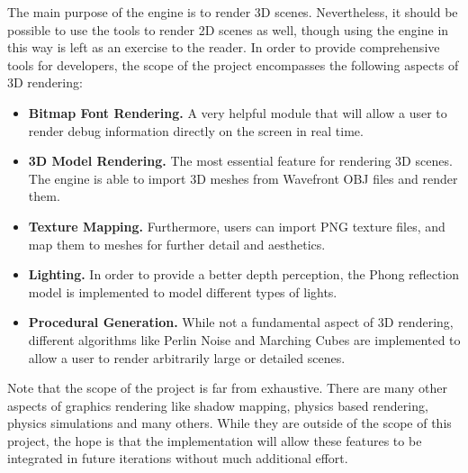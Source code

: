 The main purpose of the engine is to render 3D scenes.
Nevertheless, it should be possible to use the tools to render 2D scenes as well,
though using the engine in this way is left as an exercise to the reader.
In order to provide comprehensive tools for developers,
the scope of the project encompasses the following aspects of 3D rendering:

\begin{itemize}
  \item \textbf{Bitmap Font Rendering.} A very helpful module that will allow a user to render debug information directly on the screen in real time.
  \item \textbf{3D Model Rendering.} The most essential feature for rendering 3D scenes. The engine is able to import 3D meshes from Wavefront OBJ files and render them.
  \item \textbf{Texture Mapping.} Furthermore, users can import PNG texture files, and map them to meshes for further detail and aesthetics.
  \item \textbf{Lighting.} In order to provide a better depth perception, the Phong reflection model is implemented to model different types of lights.
  \item \textbf{Procedural Generation.} While not a fundamental aspect of 3D rendering, different algorithms like Perlin Noise and Marching Cubes are implemented to allow a user to render arbitrarily large or detailed scenes.
\end{itemize}

Note that the scope of the project is far from exhaustive.
There are many other aspects of graphics rendering like shadow mapping, physics based rendering, physics simulations and many others\cite{learnopengl}.
While they are outside of the scope of this project,
the hope is that the implementation will allow these features to be integrated in future iterations without much additional effort.
